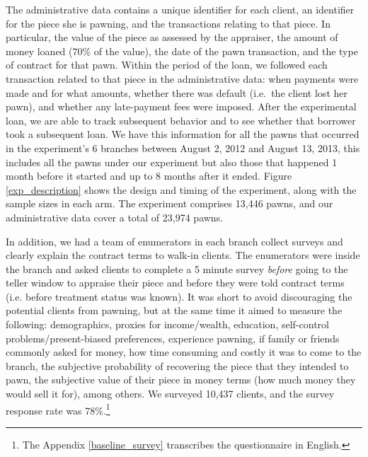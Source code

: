 \documentclass[oneside,11pt]{article}
\begin{document}

The administrative data contains a unique identifier for each client, an identifier for the piece she is pawning, and the transactions relating to that piece. In particular, the value of the piece as assessed by the appraiser, the amount of money loaned (70\% of the value), the date of the pawn transaction, and the type of contract for that pawn. Within the period of the loan, we followed each transaction related to that piece in the administrative data: when payments were made and for what amounts, whether there was default (i.e.\ the client lost her pawn), and whether any late-payment fees were imposed. After the experimental loan, we are able to track subsequent behavior and to see whether that borrower took a subsequent loan.  We have this information for all the pawns that occurred in the experiment's 6 branches between August 2, 2012 and August 13, 2013, this includes all the pawns under our experiment but also those that happened 1 month before it started and up to 8 months after it ended. Figure \ref{exp_description} shows the design and timing of the experiment, along with the sample sizes in each arm. The experiment comprises 13,446 pawns, and our administrative data cover a total of 23,974 pawns.




In addition, we had a team of enumerators in each branch collect surveys and clearly explain the contract terms to walk-in clients. The enumerators were inside the branch and asked clients to complete a 5 minute survey \textit{before} going to the teller window to appraise their piece and before they were told contract terms (i.e. before treatment status was known). It was short to avoid discouraging the potential clients from pawning, but at the same time it aimed to measure the following: demographics, proxies for income/wealth, education, self-control problems/present-biased preferences, experience pawning, if family or friends commonly asked for money, how time consuming and costly it was to come to the branch, the subjective probability of recovering the piece that they intended to pawn, the subjective value of their piece in money terms (how much money they would sell it for), among others. We surveyed 10,437 clients, and the survey response rate was 78\%.\footnote{The Appendix \ref{baseline_survey} transcribes the questionnaire in English.} %
\end{document}
